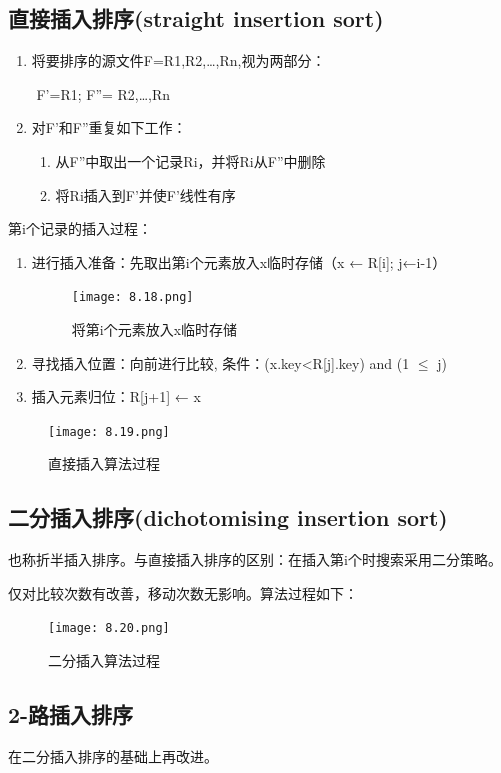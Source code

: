 \documentclass[AutoFakeBold]{LZUThesis2007}
\begin{document}
		\subsection{直接插入排序(straight insertion sort)}
\begin{enumerate}
	\item 将要排序的源文件F=R1,R2,…,Rn,视为两部分：

​ F'=R1; F''= R2,…,Rn
	\item 对F'和F''重复如下工作：
\begin{enumerate}
	\item 从F''中取出一个记录Ri，并将Ri从F''中删除
	\item 将Ri插入到F'并使F'线性有序
\end{enumerate}

\end{enumerate}
第i个记录的插入过程：
\begin{enumerate}
	\item 进行插入准备：先取出第i个元素放入x临时存储（x ← R[i]; j←i-1）
\begin{figure}[H]
    \centering
    \texttt{[image: 8.18.png]}
    \caption{将第i个元素放入x临时存储}
    \label{fig_install_texlive}
\end{figure}

	\item 寻找插入位置：向前进行比较, 条件：(x.key<R[j].key) and (1 $\le$ j)

	\item 插入元素归位：R[j+1] ← x
\end{enumerate}

\begin{figure}[H]
    \centering
    \texttt{[image: 8.19.png]}
    \caption{直接插入算法过程}
    \label{fig_install_texlive}
\end{figure}

		\subsection{二分插入排序(dichotomising  insertion sort)}
也称折半插入排序。与直接插入排序的区别：在插入第i个时搜索采用二分策略。

仅对比较次数有改善，移动次数无影响。算法过程如下：
\begin{figure}[H]
    \centering
    \texttt{[image: 8.20.png]}
    \caption{二分插入算法过程}
    \label{fig_install_texlive}
\end{figure}

		\subsection{2-路插入排序}
在二分插入排序的基础上再改进。
\end{document}
